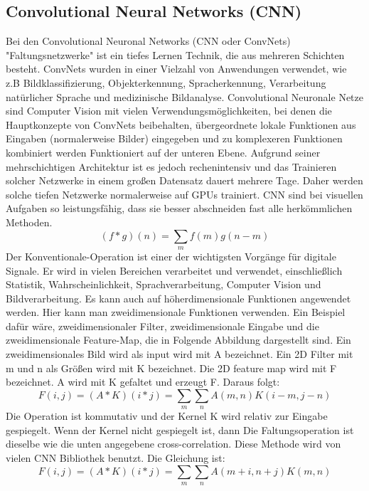 \documentclass[a4paper,11pt]{article}
\theoremstyle{mytheor}
\begin{document}
\subsection{Convolutional Neural Networks (CNN)}
Bei den Convolutional Neuronal Networks (CNN oder ConvNets) "Faltungsnetzwerke" ist ein tiefes Lernen Technik, die aus mehreren Schichten besteht. ConvNets wurden in einer Vielzahl von Anwendungen verwendet, wie z.B Bildklassifizierung, Objekterkennung, Spracherkennung, Verarbeitung natürlicher Sprache und medizinische Bildanalyse. Convolutional Neuronale Netze sind Computer Vision mit vielen Verwendungsmöglichkeiten, bei denen die Hauptkonzepte von ConvNets beibehalten, übergeordnete lokale Funktionen aus Eingaben (normalerweise Bilder) eingegeben und zu komplexeren Funktionen kombiniert werden Funktioniert auf der unteren Ebene. Aufgrund seiner mehrschichtigen Architektur ist es jedoch rechenintensiv und das Trainieren solcher Netzwerke in einem großen Datensatz dauert mehrere Tage. Daher werden solche tiefen Netzwerke normalerweise auf GPUs trainiert. CNN sind bei visuellen Aufgaben so leistungsfähig, dass sie besser abschneiden fast alle herkömmlichen Methoden\cite{CNN}.\\
\begin{displaymath}
(f*g)(n) = \sum_{m} f(m)g(n-m)
\end{displaymath}
Der Konventionale-Operation ist einer der wichtigsten Vorgänge für digitale Signale. Er wird in vielen Bereichen verarbeitet und verwendet, einschließlich Statistik, Wahrscheinlichkeit, Sprachverarbeitung, Computer Vision und Bildverarbeitung. Es kann auch auf höherdimensionale Funktionen angewendet werden. Hier kann man zweidimensionale Funktionen verwenden. Ein Beispiel dafür wäre, zweidimensionaler Filter, zweidimensionale Eingabe und die zweidimensionale Feature-Map, die in Folgende Abbildung dargestellt sind. Ein zweidimensionales Bild wird als input wird mit A bezeichnet. Ein 2D Filter mit m und n als Größen wird mit K bezeichnet. Die 2D feature map wird mit F bezeichnet. A wird mit K gefaltet und erzeugt F. Daraus folgt:
\begin{displaymath}
F(i,j) = (A*K)(i*j)= \sum_{m} \sum_{n} A(m,n)K(i-m, j-n)
\end{displaymath} 
Die Operation ist kommutativ und der Kernel K wird relativ zur Eingabe gespiegelt. Wenn der Kernel nicht gespiegelt ist, dann
Die Faltungsoperation ist dieselbe wie die unten angegebene cross-correlation. Diese Methode wird von vielen CNN Bibliothek benutzt. Die Gleichung ist:
\begin{displaymath}
F(i,j) = (A*K)(i*j)= \sum_{m} \sum_{n} A(m+i, n+j)K(m, n)
\end{displaymath}
\end{document}
